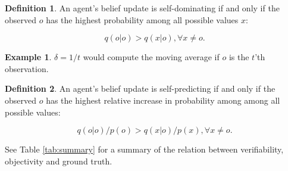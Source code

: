 \documentclass{report}
\theoremstyle{definition}
\newtheorem{definition}{Definition}
\newtheorem{example}[]{Example}
\begin{document}
\begin{definition} An agent's belief update is self-dominating if and only if the observed $o$ has the highest probability among all possible values $x$:

\begin{equation}
    q(o|o) > q(x|o), \forall x \neq o.
\end{equation}
\end{definition}
\begin{example}
$\delta = 1/t$ would compute the moving average if $o$ is the $t$'th observation.
\end{example}

\begin{definition}
\label{def:self_predicitng}
An agent's belief update is self-predicting if and only if the observed $o$ has the highest relative increase in probability among  among all possible values:

\begin{equation}
    q(o|o)/p(o) > q(x|o)/p(x), \forall x \neq o.
\end{equation}
\end{definition}






See Table \ref{tab:summary} for a summary of the relation between verifiability, objectivity and ground truth.
\end{document}
